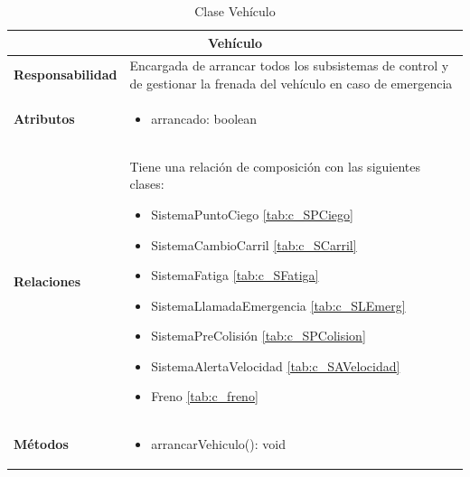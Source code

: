 \begin{table}[H]
\begin{center}
\begin{tabular}{p{} p{11cm}}
\multicolumn{2}{c}{\textbf{Vehículo} } \\ \hline \hline
\textbf{Responsabilidad} &  Encargada de arrancar todos los subsistemas de control y de gestionar la frenada del vehículo en caso de emergencia\\ \hline
\textbf{Atributos} &  \begin{itemize} \item arrancado: boolean \end{itemize}\\ \hline
\textbf{Relaciones} & Tiene una relación de composición con las siguientes clases:
                      \begin{itemize}
                        \item SistemaPuntoCiego \ref{tab:c_SPCiego}
                        \item SistemaCambioCarril \ref{tab:c_SCarril}
                        \item SistemaFatiga \ref{tab:c_SFatiga}
                        \item SistemaLlamadaEmergencia \ref{tab:c_SLEmerg}
                        \item SistemaPreColisión \ref{tab:c_SPColision}
                        \item SistemaAlertaVelocidad \ref{tab:c_SAVelocidad}
                        \item Freno \ref{tab:c_freno}
                      \end{itemize}\\ \hline
\textbf{Métodos} &  \begin{itemize}
                      \item arrancarVehiculo(): void
                    \end{itemize}\\ \hline
\end{tabular}
\caption{Clase Vehículo}
\label{tab:c_vehiculo}
\end{center}
\end{table}










